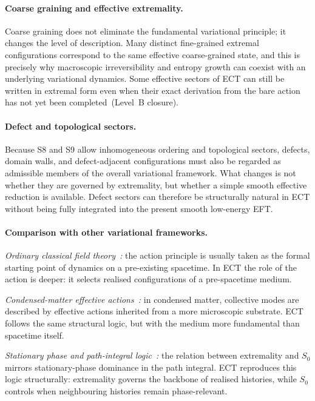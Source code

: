 \documentclass[11pt,a4paper]{article}
\numberwithin{equation}{section}
\begin{document}
\paragraph{Coarse graining and effective extremality.}
Coarse graining does not eliminate the fundamental variational
principle; it changes the level of description.
Many distinct fine-grained extremal configurations correspond to the
same effective coarse-grained state, and this is precisely why
macroscopic irreversibility and entropy growth can coexist with
an underlying variational dynamics.
Some effective sectors of ECT can still be written in extremal form
even when their exact derivation from the bare action has not yet
been completed~(Level~B closure).

\paragraph{Defect and topological sectors.}
Because S8 and S9 allow inhomogeneous ordering and topological sectors,
defects, domain walls, and defect-adjacent configurations must also be
regarded as admissible members of the overall variational framework.
What changes is not whether they are governed by extremality, but
whether a simple smooth effective reduction is available.
Defect sectors can therefore be structurally natural in ECT without
being fully integrated into the present smooth low-energy EFT.

\paragraph{Comparison with other variational frameworks.}

\emph{Ordinary classical field theory~\cite{Landau1987Fields}:}
the action principle is usually taken as the formal starting point of
dynamics on a pre-existing spacetime.
In ECT the role of the action is deeper: it selects realised
configurations of a pre-spacetime medium.

\emph{Condensed-matter effective actions~\cite{Volovik2003}:}
in condensed matter, collective modes are described by effective actions
inherited from a more microscopic substrate.
ECT follows the same structural logic, but with the medium more
fundamental than spacetime itself.

\emph{Stationary phase and path-integral logic~\cite{FeynmanHibbs1965}:}
the relation between extremality and $S_0$ mirrors stationary-phase
dominance in the path integral.
ECT reproduces this logic structurally: extremality governs the
backbone of realised histories, while $S_0$ controls when neighbouring
histories remain phase-relevant.
\end{document}
